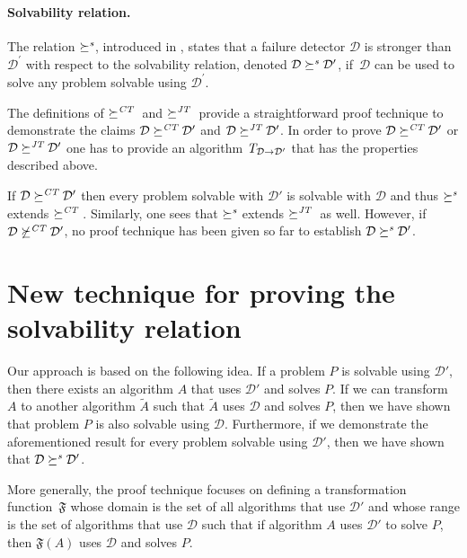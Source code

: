 \documentclass[11pt]{article}
\newcommand{\ident}[1]{\textit{#1}\rule{0cm}{1ex}}
\newcommand{\D}{\mathcal{D}}
\newcommand{\problem}{P} \newcommand{\Alg}{A}
\newcommand{\Trans}[1]{\ident{T}_{#1}}
\newcommand{\TrAlg}{\widetilde{A}}
\newcommand{\redCT}{\succeq^\ident{CT}}
\newcommand{\redJT}{\succeq^\ident{JT}}
\newcommand{\redSolv}{\succeq^{\ident{s}}}
\begin{document}
\paragraph{Solvability relation.} 

The relation $\redSolv$, introduced in \cite{charron-bost:10:isolt},
     states that a failure detector $\D$ is stronger than $\D^\prime$
     with respect to the solvability relation, denoted
     $\D\redSolv\D^\prime$, if~$\D$ {can be used to solve} any problem
     solvable using $\D^\prime$.


\bigskip



The definitions of $\redCT$ and $\redJT$ provide a straightforward
     proof technique to demonstrate the claims $\D \redCT \D'$ and $\D
     \redJT \D'$.
In order to prove $\D \redCT \D'$ or  $\D \redJT \D'$ one has to
     provide an algorithm $\Trans{\D\rightarrow\D'}$ that has the
     properties described above.


If $\D\redCT\D'$ then every problem solvable with $\D'$ is solvable
     with $\D$ \cite{chan:ufdfr,chan:twfdf1} and thus  $\redSolv$
     extends $\redCT$.
Similarly, one sees that $\redSolv$ extends $\redJT$ as well.
However, if  $\D\not\redCT\D'$, no proof technique has been given so
     far to establish $\D\redSolv\D'$.

\section{New technique for proving the solvability relation} 

Our approach is based on the following idea.
If a problem $\problem$ is solvable using $\D'$, then there exists an
     algorithm $\Alg$ that uses $\D'$ and solves $\problem$.
If we can transform $\Alg$ to another algorithm $\TrAlg$ such that
     $\TrAlg$ uses $\D$ and solves $\problem$, then we have shown that
     problem $\problem$ is also solvable using $\D$.
Furthermore, if we demonstrate the aforementioned result for every
     problem solvable using $\D'$, then we have shown that
     $\D\redSolv\D'$.

More generally, the proof technique focuses on defining a
     transformation function~$\mathfrak{F}$ whose domain is the set of
     all algorithms that use $\D'$ and whose range is the set of
     algorithms that use $\D$ such that if algorithm $\Alg$  uses
     $\D'$ to solve $\problem$, then $\mathfrak{F}(\Alg)$ uses $\D$
     and solves $\problem$.
\end{document}
